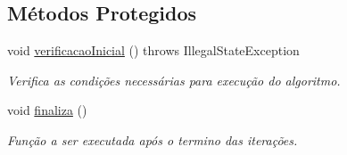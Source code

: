 \subsection*{Métodos Protegidos}
\begin{DoxyCompactItemize}
\item 
void \hyperlink{classic_1_1populacional_1_1algoritmo_1_1_algoritmo_evolucionario_3_01_g_01extends_01_number_00_0bd52af860edf752f8985460efb0aa102_a1bf1d990fec4085367705145cb2a18d3}{verificacao\-Inicial} ()  throws Illegal\-State\-Exception 
\begin{DoxyCompactList}\small\item\em Verifica as condições necessárias para execução do algoritmo. \end{DoxyCompactList}\item 
void \hyperlink{classic_1_1populacional_1_1algoritmo_1_1_algoritmo_evolucionario_3_01_g_01extends_01_number_00_0bd52af860edf752f8985460efb0aa102_a330fe8023d5dc2cde107c49446c328fd}{finaliza} ()
\begin{DoxyCompactList}\small\item\em Função a ser executada após o termino das iterações. \end{DoxyCompactList}\end{DoxyCompactItemize}
